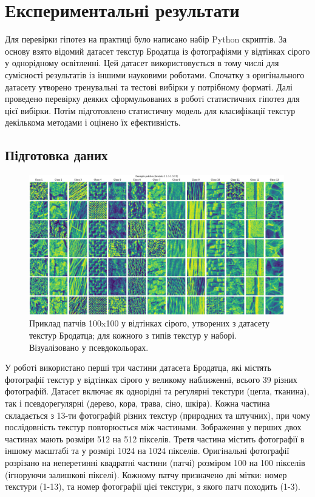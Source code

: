 \section{Експериментальні результати}\label{section2.1}

Для перевірки гіпотез на практиці було написано набір Python скриптів.
За основу взято відомий датасет текстур Бродатца \cite{brodatz} із фотографіями у відтінках сірого у однорідному освітленні.
Цей датасет використовується в тому числі для сумісності результатів із іншими науковими роботами.
Спочатку з оригінального датасету утворено тренувальні та тестові вибірки у потрібному форматі.
Далі проведено перевірку деяких сформульованих в роботі статистичних гіпотез для цієї вибірки.
Потім підготовлено статистичну модель для класифікації текстур декількома методами і оцінено їх ефективність.

\subsection{Підготовка даних}\label{section2.1a}

\begin{figure}[h]
    \centering
    \includegraphics[width=0.99\textwidth]{img/example_classes.png}
    \caption{
        Приклад патчів 100x100 у відтінках сірого, утворених з датасету текстур Бродатца; для кожного з типів текстур у наборі.
        Візуалізовано у псевдокольорах.
    }
    \label{fig:brodatz-showcase}
\end{figure}

У роботі використано перші три частини датасета Бродатца, які містять фотографії текстур у відтінках сірого у великому наближенні, всього 39 різних фотографій.
Датасет включає як однорідні та регулярні текстури (цегла, тканина), так і псевдорегулярні (дерево, кора, трава, сіно, шкіра). 
Кожна частина складається з 13-ти фотографій різних текстур (природних та штучних), при чому послідовність текстур повторюється між частинами. 
Зображення у перших двох частинах мають розміри 512 на 512 пікселів. 
Третя частина містить фотографії в іншому масштабі та у розмірі 1024 на 1024 пікселів.
Оригінальні фотографії розрізано на неперетинні квадратні частини (патчі) розміром 100 на 100 пікселів (ігноруючи залишкові пікселі).
Кожному патчу призначено дві мітки: номер текстури (1-13), та номер фотографії цієї текстури, з якого патч походить (1-3).

